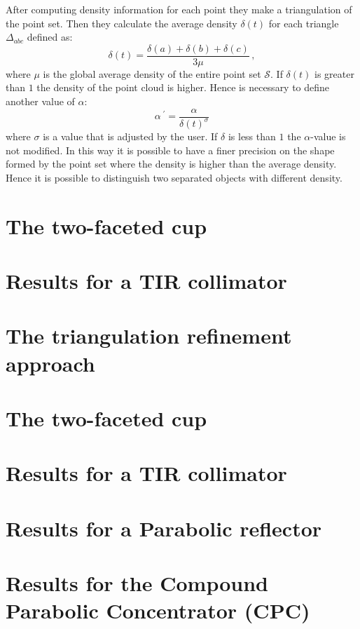 After computing density information for each point they make a triangulation of the point set. Then they calculate the average density  $\delta(t)$ for each triangle $\Delta_{abc}$ defined as:
\begin{equation}
\delta(t)=\frac{\delta(a)+\delta(b)+\delta(c)}{3 \mu}\,,
\label{delta_t}
\end{equation}
where $\mu$ is the global average density of the entire point set $\mathcal{S}$.
If $\delta(t)$ is greater than $1$ the density of the point cloud is higher. Hence is necessary to define another value of $\alpha$:
\begin{equation}
\alpha^{\;\prime} = \frac{\alpha}{\delta(t)^\sigma}
\end{equation} where $\sigma$ is a value that is adjusted by the user.
If  $\delta$ is less than $1$ the $\alpha$-value is not modified.
In this way it is possible to have a finer precision on the shape formed by the point set where the density is higher than the average density. Hence it is possible to distinguish two separated objects with different density.
\section{The two-faceted cup}
\section{Results for a TIR collimator}
\section{The triangulation refinement approach}
\section{The two-faceted cup}
\section{Results for a TIR collimator}
\section{Results for a Parabolic reflector}
\section{Results for the Compound Parabolic Concentrator (CPC)}

